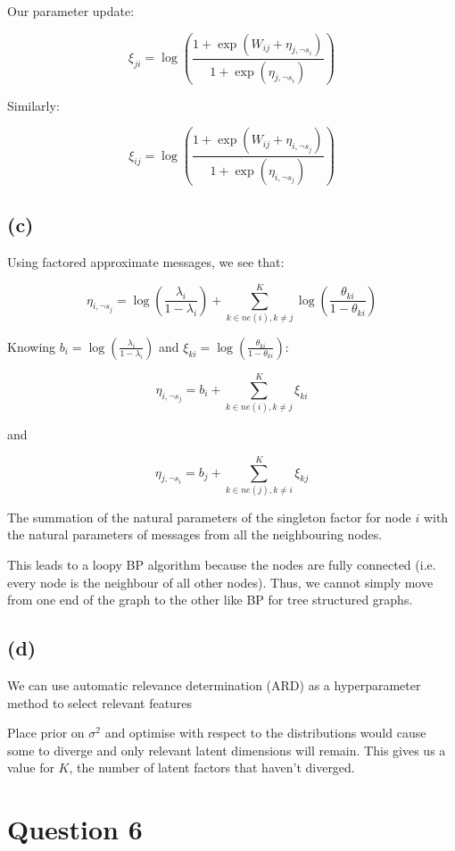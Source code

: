 \documentclass[12pt]{article}
\begin{document}
Our parameter update:

\[\xi_{ji} = \log \left( \frac{1+\exp\left( W_{ij}  + \eta_{j, \neg s_i}\right)}{1+\exp\left( \eta_{j, \neg s_i}\right)} \right)\]

Similarly:

\[\xi_{ij} = \log \left( \frac{1+\exp\left( W_{ij}  + \eta_{i, \neg s_j}\right)}{1+\exp\left( \eta_{i, \neg s_j}\right)} \right)\]


\subsection*{(c)}

Using factored approximate messages, we see that:

\[\eta_{i, \neg s_j} =  \log \left(\frac{\lambda_i}{1-\lambda_i}\right) + \sum_{k\in ne(i), k\neq j}^{K} \log\left(\frac{\theta_{ki}}{1-\theta_{ki}} \right)\]

Knowing $b_i=\log \left(\frac{\lambda_i}{1-\lambda_i}\right)$ and $\xi_{ki}=\log\left(\frac{\theta_{ki}}{1-\theta_{ki}} \right)$:

\[\eta_{i, \neg s_j} =  b_i + \sum_{k\in ne(i), k\neq j}^{K} \xi_{ki}\]

and

\[\eta_{j, \neg s_i} =  b_j + \sum_{k\in ne(j), k\neq i}^{K} \xi_{kj}\]


The summation of the natural parameters of the singleton factor for node $i$ with the natural parameters of messages from all the neighbouring nodes.

This leads to a loopy BP algorithm because the nodes are fully connected (i.e. every node is the neighbour of all other nodes). Thus, we cannot simply move from one end of the graph to the other like BP for tree structured graphs.

\subsection*{(d)}

We can use automatic relevance determination (ARD) as a hyperparameter method to select relevant features

Place prior on $\sigma^2$ and optimise with respect to the distributions would cause some to diverge and only relevant latent dimensions will remain.
This gives us a value for $K$, the number of latent factors that haven't diverged.


\newpage
\section*{Question 6}
\end{document}
